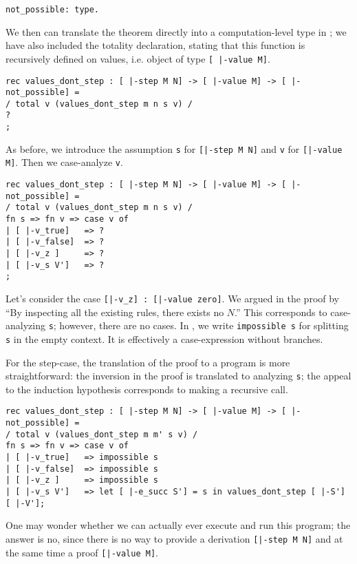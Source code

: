 \begin{lstlisting}
not_possible: type.
\end{lstlisting}

We then can translate the theorem directly into a computation-level type in
\beluga; we have also included the totality  declaration,
stating that this function is recursively defined on values, i.e. object of type
\lstinline![ |-value M]!.

\begin{lstlisting}
rec values_dont_step : [ |-step M N] -> [ |-value M] -> [ |-not_possible] =
/ total v (values_dont_step m n s v) /
?
;
\end{lstlisting}

As before, we introduce the assumption \lstinline!s! for
\lstinline![|-step M N]! and \lstinline!v! for
\lstinline![|-value M]!. Then we case-analyze \lstinline!v!.

\begin{lstlisting}
rec values_dont_step : [ |-step M N] -> [ |-value M] -> [ |-not_possible] =
/ total v (values_dont_step m n s v) /
fn s => fn v => case v of
| [ |-v_true]   => ?
| [ |-v_false]  => ?
| [ |-v_z ]     => ?
| [ |-v_s V']   => ?
;
\end{lstlisting}

Let's consider the case \lstinline![|-v_z] : [|-value zero]!. We argued in the
proof by ``By inspecting all the existing rules, there exists no $N$.'' This
corresponds to case-analyzing \lstinline!s!; however, there are no cases. In
\beluga, we write \lstinline!impossible s! for splitting \lstinline!s! in
the empty context. It is effectively a case-expression without branches.

For the step-case, the translation of the proof to a program is more
straightforward: the inversion in the proof is translated to analyzing
\lstinline!s!; the appeal to the induction hypothesis corresponds to making a
recursive call.

\begin{lstlisting}
rec values_dont_step : [ |-step M N] -> [ |-value M] -> [ |-not_possible] =
/ total v (values_dont_step m m' s v) /
fn s => fn v => case v of
| [ |-v_true]   => impossible s
| [ |-v_false]  => impossible s
| [ |-v_z ]     => impossible s
| [ |-v_s V']   => let [ |-e_succ S'] = s in values_dont_step [ |-S'] [ |-V'];
\end{lstlisting}

One may wonder whether we can actually ever execute and run this program; the
answer is no, since there is no way to provide a derivation
\lstinline![|-step M N]! and at the same time a proof \lstinline![|-value M]!.

